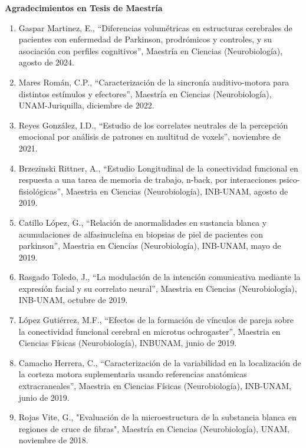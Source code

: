 \textbf{Agradecimientos en Tesis de Maestría}

\begin{enumerate}
\item Gaspar Martinez, E., “Diferencias volumétricas en estructuras cerebrales de pacientes con enfermedad de Parkinson, 
prodrómicos y controles, y su asociación con perfiles cognitivos”, Maestría en Ciencias (Neurobiología), agosto de 2024.

\item  Mares Román, C.P., “Caracterización de la sincronía auditivo-motora para distintos estímulos y efectores”, Maestría en 
Ciencias (Neurobiología), UNAM-Juriquilla, diciembre de 2022.

\item  Reyes González, I.D., “Estudio de los correlates neutrales de la percepción emocional por análisis
de patrones en multitud de voxels”, noviembre de 2021.

\item  Brzezinski Rittner, A., “Estudio Longitudinal de la conectividad funcional en respuesta a una tarea de memoria de 
trabajo, 
n-back, por interacciones psico-fisiológicas”, Maestria en Ciencias (Neurobiología), INB-UNAM, agosto de 2019.

\item  Catillo López, G., “Relación de anormalidades en sustancia blanca y acumulaciones de alfasinucleína en biopsias de piel 
de 
pacientes con parkinson”, Maestria en Ciencias (Neurobiología), INB-UNAM, mayo de 2019.

\item  Rasgado Toledo, J., “La modulación de la intención comunicativa mediante la expresión facial y su correlato neural”, 
Maestria en Ciencias (Neurobiología), INB-UNAM, octubre de 2019.

\item  López Gutiérrez, M.F., “Efectos de la formación de vínculos de pareja sobre la conectividad funcional cerebral en 
microtus 
ochrogaster”, Maestria en Ciencias Físicas (Neurobiología), INBUNAM, junio de 2019.

\item  Camacho Herrera, C., “Caracterización de la variabilidad en la localización de la corteza motora suplementaria usando 
referencias anatómicas extracraneales”, Maestria en Ciencias Físicas (Neurobiología), INB-UNAM, junio de 2019.

\item  Rojas Vite, G., "Evaluación de la microestructura de la substancia blanca en regiones de cruce de fibras", Maestría en 
Ciencias (Neurobiología), UNAM, noviembre de 2018.


\end{enumerate}
